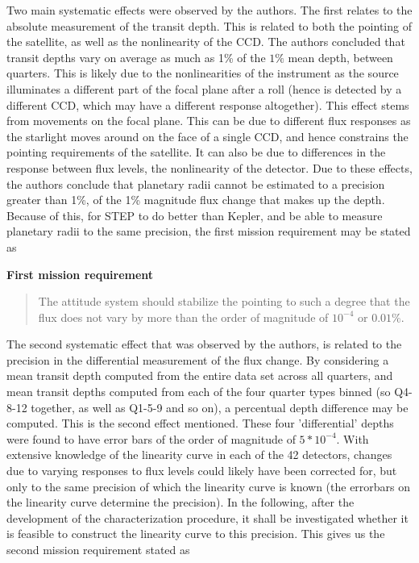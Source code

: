 \documentclass[../main.tex]{subfiles}
\begin{document}
	Two main systematic effects were observed by the authors. The first relates to the absolute measurement of the transit depth. This is related to both the pointing of the satellite, as well as the nonlinearity of the CCD. The authors concluded that transit depths vary on average as much as 1\% of the $1\%$ mean depth, between quarters. This is likely due to the nonlinearities of the instrument as the source illuminates a different part of the focal plane after a roll (hence is detected by a different CCD, which may have a different response altogether). This effect stems from movements on the focal plane. This can be due to different flux responses as the starlight moves around on the face of a single CCD, and hence constrains the pointing requirements of the satellite. It can also be due to differences in the response between flux levels, the nonlinearity of the detector. Due to these effects, the authors conclude that planetary radii cannot be estimated to a precision greater than 1\%, of the 1\% magnitude flux change that makes up the depth. Because of this, for STEP to do better than Kepler, and be able to measure planetary radii to the same precision, the first mission requirement may be stated as
	
	\begin{tcolorbox}[colframe = white, sharpish corners]
		\textbf{First mission requirement}
		\begin{quote}
			The attitude system should stabilize the pointing to such a degree that the flux does not vary by more than the order of magnitude of $10^{-4}$ or $0.01\%$. 
		\end{quote}
	\end{tcolorbox}
	
	The second systematic effect that was observed by the authors, is related to the precision in the differential measurement of the flux change. By considering a mean transit depth computed from the entire data set across all quarters, and mean transit depths computed from each of the four quarter types binned (so Q4-8-12 together, as well as Q1-5-9 and so on), a percentual depth difference may be computed. This is the second effect mentioned. These four 'differential' depths were found to have error bars of the order of magnitude of $5*10^{-4}$. With extensive knowledge of the linearity curve in each of the 42 detectors, changes due to varying responses to flux levels could likely have been corrected for, but only to the same precision of which the linearity curve is known (the errorbars on the linearity curve determine the precision). In the following, after the development of the characterization procedure, it shall be investigated whether it is feasible to construct the linearity curve to this precision. This gives us the second mission requirement stated as
	
\end{document}
